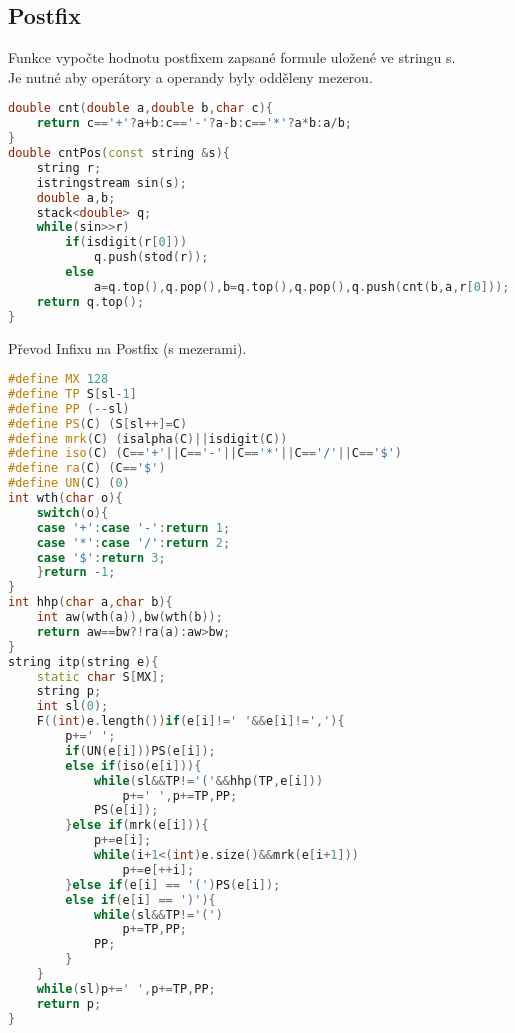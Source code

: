 \documentclass[11pt]{article}
\begin{document}
\subsection{Postfix}
Funkce vypočte hodnotu postfixem zapsané formule uložené ve stringu \textsf{s}.
\\Je nutné aby operátory a operandy byly odděleny mezerou.
\begin{lstlisting}[language=C++]
double cnt(double a,double b,char c){
    return c=='+'?a+b:c=='-'?a-b:c=='*'?a*b:a/b;
}
double cntPos(const string &s){
    string r;
    istringstream sin(s);
    double a,b;
    stack<double> q;
    while(sin>>r)
        if(isdigit(r[0]))
            q.push(stod(r));
        else
            a=q.top(),q.pop(),b=q.top(),q.pop(),q.push(cnt(b,a,r[0]));
    return q.top();
}
\end{lstlisting}
Převod Infixu na Postfix (s mezerami).
\begin{lstlisting}[language=C++]
#define MX 128
#define TP S[sl-1]
#define PP (--sl)
#define PS(C) (S[sl++]=C)
#define mrk(C) (isalpha(C)||isdigit(C))
#define iso(C) (C=='+'||C=='-'||C=='*'||C=='/'||C=='$')
#define ra(C) (C=='$')
#define UN(C) (0)
int wth(char o){
    switch(o){
	case '+':case '-':return 1;
	case '*':case '/':return 2;
	case '$':return 3;
    }return -1;
}
int hhp(char a,char b){
    int aw(wth(a)),bw(wth(b));
    return aw==bw?!ra(a):aw>bw;
}
string itp(string e){
    static char S[MX];
    string p;
    int sl(0);
    F((int)e.length())if(e[i]!=' '&&e[i]!=','){
        p+=' ';
        if(UN(e[i]))PS(e[i]);
        else if(iso(e[i])){
            while(sl&&TP!='('&&hhp(TP,e[i]))
                p+=' ',p+=TP,PP;
            PS(e[i]);
        }else if(mrk(e[i])){
            p+=e[i];
            while(i+1<(int)e.size()&&mrk(e[i+1]))
                p+=e[++i];
        }else if(e[i] == '(')PS(e[i]);
        else if(e[i] == ')'){
            while(sl&&TP!='(')
                p+=TP,PP;
            PP;
        }
    }
    while(sl)p+=' ',p+=TP,PP;
    return p;
}
\end{lstlisting}
\end{document}
